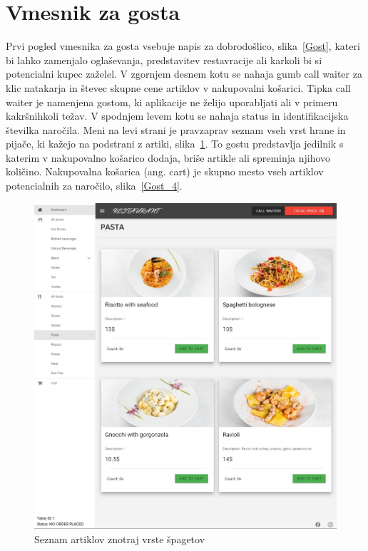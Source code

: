 \documentclass[a4paper, 12pt]{book}
\begin{document}
\section{Vmesnik za gosta}
Prvi pogled vmesnika za gosta vsebuje napis za dobrodošlico, slika~\ref{Gost}, kateri bi lahko zamenjalo oglaševanja, predstavitev restavracije ali karkoli bi si potencialni kupec zaželel. V zgornjem desnem kotu se nahaja gumb call waiter za klic natakarja in števec skupne cene artiklov v nakupovalni košarici. Tipka call waiter je namenjena gostom, ki aplikacije ne želijo uporabljati ali v primeru kakršnihkoli težav. V spodnjem levem kotu se nahaja status in identifikacijska številka naročila. Meni na levi strani je pravzaprav seznam vseh vrst hrane in pijače, ki kažejo na podstrani z artiki, slika~\ref{Gost_3}. To gostu predstavlja jedilnik s katerim v nakupovalno košarico dodaja, briše artikle ali spreminja njihovo količino. Nakupovalna košarica (ang. cart) je skupno mesto vseh artiklov potencialnih za naročilo, slika~\ref{Gost_4}.

\begin{figure}[!htb]
\begin{center}
\includegraphics[width=12.5cm]{gost_3.jpg}
\caption{Seznam artiklov znotraj vrste špagetov}
\label{Gost_3}
\end{center}
\end{figure}
\end{document}
